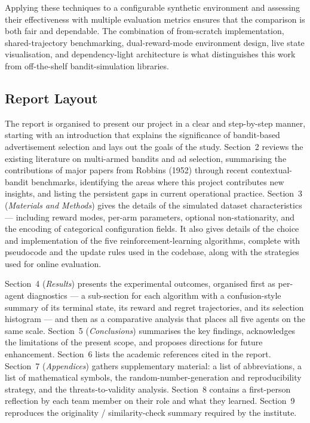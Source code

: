 Applying these techniques to a configurable synthetic environment and assessing their effectiveness with multiple evaluation metrics ensures that the comparison is both fair and dependable. The combination of from-scratch implementation, shared-trajectory benchmarking, dual-reward-mode environment design, live state visualisation, and dependency-light architecture is what distinguishes this work from off-the-shelf bandit-simulation libraries.

\subsection{Report Layout}
The report is organised to present our project in a clear and step-by-step manner, starting with an introduction that explains the significance of bandit-based advertisement selection and lays out the goals of the study. Section~2 reviews the existing literature on multi-armed bandits and ad selection, summarising the contributions of major papers from Robbins (1952) through recent contextual-bandit benchmarks, identifying the areas where this project contributes new insights, and listing the persistent gaps in current operational practice. Section~3 (\emph{Materials and Methods}) gives the details of the simulated dataset characteristics --- including reward modes, per-arm parameters, optional non-stationarity, and the encoding of categorical configuration fields. It also gives details of the choice and implementation of the five reinforcement-learning algorithms, complete with pseudocode and the update rules used in the codebase, along with the strategies used for online evaluation.

Section~4 (\emph{Results}) presents the experimental outcomes, organised first as per-agent diagnostics --- a sub-section for each algorithm with a confusion-style summary of its terminal state, its reward and regret trajectories, and its selection histogram --- and then as a comparative analysis that places all five agents on the same scale. Section~5 (\emph{Conclusions}) summarises the key findings, acknowledges the limitations of the present scope, and proposes directions for future enhancement. Section~6 lists the academic references cited in the report. Section~7 (\emph{Appendices}) gathers supplementary material: a list of abbreviations, a list of mathematical symbols, the random-number-generation and reproducibility strategy, and the threats-to-validity analysis. Section~8 contains a first-person reflection by each team member on their role and what they learned. Section~9 reproduces the originality / similarity-check summary required by the institute.
\newpage

